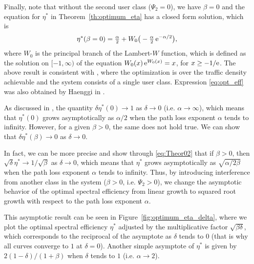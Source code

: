 Finally, note that without the second user class ($\Psi_2 = 0$), we have $\beta=0$ and the equation for $\eta^*$ in Theorem~\ref{th:optimum_eta} has a closed form solution, which is
\begin{equation}\label{eq:opt_eff}
	\eta^*(\beta=0) = \tfrac{\alpha}{2} +
    W_0\big(-\tfrac{\alpha}{2}\,\mathrm{e}^{-\alpha/2} \big),
\end{equation}
where $W_0$ is the principal branch of the Lambert-$W$ function, which is defined as the solution on $[-1,\infty)$ of the equation $W_0(x)\,\mathrm{e}^{W_0(x)} = x$, for $x \ge -1/\mathrm{e}$.
%
The above result is consistent with \cite[Theorem~2]{jindal2008bandwidth}, where the optimization is over the traffic density achievable and the system consists of a single user class. Expression \eqref{eq:opt_eff} was also obtained by Haenggi in \cite{Haenggi_Lambert}.

As discussed in \cite{jindal2008bandwidth}, the quantity $\delta \eta^*(0) \to 1$ as $\delta \to 0$ (i.e. $\alpha\to\infty$), which means that $\eta^*(0)$ grows asymptotically as $\alpha/2$ when the path loss exponent $\alpha$ tends to infinity.
%
However, for a given $\beta>0$, the same does not hold true. We can show that $\delta \eta^*(\beta) \to 0$ as $\delta \to 0$.

In fact, we can be more precise and show through \eqref{eq:Theor02} that if $\beta>0$, then $\sqrt{\delta} \eta^* \to 1/\sqrt{\beta}$ as $\delta\to 0$, which means that $\eta^*$ grows asymptotically as $\sqrt{\alpha/2\beta}$ when the path loss exponent $\alpha$ tends to infinity.
%
Thus, by introducing interference from another class in the system ($\beta>0$, i.e. $\Psi_2>0$), we change the asymptotic behavior of the optimal spectral efficiency from linear growth to squared root growth with respect to the path loss exponent $\alpha$.

This asymptotic result can be seen in Figure~\ref{fig:optimum_eta_delta}, where we plot the optimal spectral efficiency $\eta^*$ adjusted by the multiplicative factor $\sqrt{\beta\delta}$, which corresponds to the reciprocal of the asymptote as $\delta$ tends to $0$ (that is why all curves converge to $1$ at $\delta = 0$).
%
Another simple asymptote of $\eta^*$ is given by $2(1-\delta)/(1+\beta)$ when $\delta$ tends to $1$ (i.e. $\alpha\to2$).

